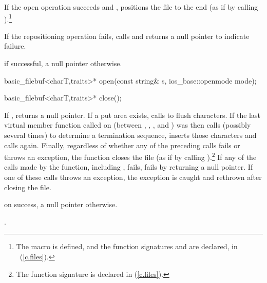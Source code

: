 \begin{itemdescr}
\pnum
If the open operation succeeds and
,
positions the file to the end
(as if by calling
).\footnote{The macro
is defined, and the function signatures
%
and
%
are declared, in
%
~(\ref{c.files}).}

\pnum
If the repositioning operation fails, calls
and returns a null pointer to indicate failure.

\pnum
\returns
{}
if successful, a null pointer otherwise.
\end{itemdescr}

%
\begin{itemdecl}
basic_filebuf<charT,traits>* open(const string& s,
    ios_base::openmode mode);
\end{itemdecl}

\begin{itemdescr}
\returns
{}
\end{itemdescr}

%
\begin{itemdecl}
basic_filebuf<charT,traits>* close();
\end{itemdecl}

\begin{itemdescr}
\pnum
\effects
If
,
returns a null pointer.
If a put area exists, calls
to flush characters.
If the last virtual member function called on
(between
,
,
,
and
)
was
then calls
(possibly several times) to determine a termination sequence, inserts those
characters and calls
again.
Finally, regardless of whether any of the preceding calls fails or throws an
exception, the function closes the file
(as if by calling
%
).\footnote{The function signature
is declared in
%
%
(\ref{c.files}).}
If any of the calls made by the function, including , fails,
 fails by returning a null pointer. If one of these calls throws an
exception, the exception is caught and rethrown after closing the file.

\pnum
\returns
{}
on success, a null pointer otherwise.

\pnum
\postcondition
{}.
\end{itemdescr}

